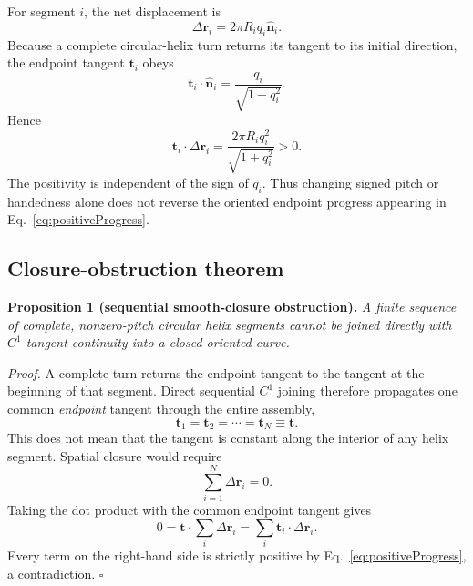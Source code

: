 \documentclass[10pt]{article}
\begin{document}
For segment $i$, the net displacement is
\begin{equation}
\Delta\bm r_i=2\pi R_i q_i\hat{\bm n}_i.
\label{eq:displacement}
\end{equation}
Because a complete circular-helix turn returns its tangent to its initial direction, the endpoint tangent $\bm t_i$ obeys
\begin{equation}
\bm t_i\cdot\hat{\bm n}_i
=\frac{q_i}{\sqrt{1+q_i^2}}.
\end{equation}
Hence
\begin{equation}
\boxed{
\bm t_i\cdot\Delta\bm r_i
=\frac{2\pi R_i q_i^2}{\sqrt{1+q_i^2}}>0.
}
\label{eq:positiveProgress}
\end{equation}
The positivity is independent of the sign of $q_i$. Thus changing signed pitch or handedness alone does not reverse the oriented endpoint progress appearing in Eq.~\eqref{eq:positiveProgress}.

\subsection{Closure-obstruction theorem}

\noindent\textbf{Proposition 1 (sequential smooth-closure obstruction).}
\emph{A finite sequence of complete, nonzero-pitch circular helix segments cannot be joined directly with $C^1$ tangent continuity into a closed oriented curve.}

\smallskip
\noindent\textit{Proof.}
A complete turn returns the endpoint tangent to the tangent at the beginning of that segment. Direct sequential $C^1$ joining therefore propagates one common \emph{endpoint} tangent through the entire assembly,
\begin{equation}
\bm t_1=\bm t_2=\cdots=\bm t_N\equiv\bm t.
\label{eq:commonTangent}
\end{equation}
This does not mean that the tangent is constant along the interior of any helix segment. Spatial closure would require
\begin{equation}
\sum_{i=1}^{N}\Delta\bm r_i=0.
\label{eq:axisClosure}
\end{equation}
Taking the dot product with the common endpoint tangent gives
\begin{equation}
0
=\bm t\cdot\sum_i\Delta\bm r_i
=\sum_i\bm t_i\cdot\Delta\bm r_i.
\end{equation}
Every term on the right-hand side is strictly positive by Eq.~\eqref{eq:positiveProgress}, a contradiction. \hfill$\square$
\end{document}
